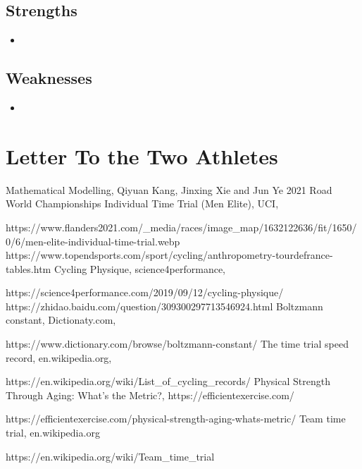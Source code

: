 \documentclass{article}
\begin{document}
		\subsection*{Strengths}
			\begin{itemize}
				\item
			\end{itemize}
		\subsection*{Weaknesses}

			\begin{itemize}
				\item
			\end{itemize}
	\newpage
	\section{Letter To the Two Athletes}
	\newpage
	\thispagestyle{empty}
	\renewcommand\refname{References}
	\clearpage
	\begin{thebibliography}{100}
		 Mathematical Modelling, Qiyuan Kang, Jinxing Xie and Jun Ye
		2021 Road World Championships Individual Time Trial (Men Elite), UCI,

		https://www.flanders2021.com/\_media/races/image\_map/1632122636/fit/1650/0/6/men-elite-individual-time-trial.webp
		https://www.topendsports.com/sport/cycling/anthropometry-tourdefrance-tables.htm
		Cycling Physique, science4performance,

		https://science4performance.com/2019/09/12/cycling-physique/
		https://zhidao.baidu.com/question/309300297713546924.html
		Boltzmann constant, Dictionaty.com,

		https://www.dictionary.com/browse/boltzmann-constant/
		The time trial speed record, en.wikipedia.org,

		https://en.wikipedia.org/wiki/List\_of\_cycling\_records/
		Physical Strength Through Aging: What’s the Metric?, https://efficientexercise.com/

		https://efficientexercise.com/physical-strength-aging-whats-metric/
		Team time trial, en.wikipedia.org

		https://en.wikipedia.org/wiki/Team\_time\_trial
	\end{thebibliography}
\end{document}
